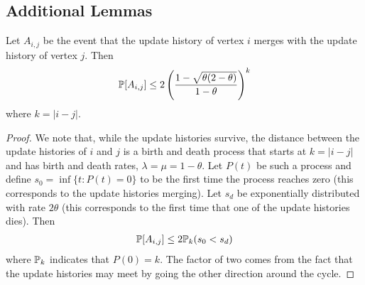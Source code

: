 	\subsection{Additional Lemmas}
	\begin{lemma}
		\label{lem: A_ij bound}
		Let $A_{i,j}$ be the event that the update history of vertex $i$ merges with the update history of vertex $j$. Then
		\begin{equation}
			\mathbb{P}[A_{i,j}] \leq 2\left(\frac{1 - \sqrt{\theta(2 - \theta)}}{1 - \theta}\right)^k
		\end{equation}
		where $k = |i - j|$.
	\end{lemma}
	\begin{proof}
		We note that, while the update histories survive, the distance between the update histories of $i$ and $j$ is a birth and death process that starts at $k = |i - j|$ and has birth and death rates, $\lambda = \mu = 1 - \theta$. Let $P(t)$ be such a process and define $s_0  = \inf\{t : P(t) = 0\}$ to be the first time the process reaches zero (this corresponds to the update histories merging). Let $s_d$ be exponentially distributed with rate $2\theta$ (this corresponds to the first time that one of the update histories dies). Then
		\begin{align}
		 	\mathbb{P}[A_{i,j}] \leq 2 \mathbb{P}_k(s_0 < s_d)
		 \end{align} 
		 where $\mathbb{P}_k$ indicates that $P(0) = k$. The factor of two comes from the fact that the update histories may meet by going the other direction around the cycle.


\end{proof}
